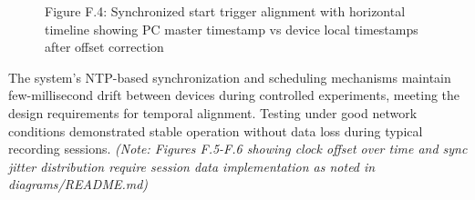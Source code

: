 \documentclass[12pt,a4paper]{article}
\begin{document}
\begin{figure}
\centering
{}
\caption{Figure F.4: Synchronized start trigger alignment with horizontal timeline showing PC master timestamp vs device local timestamps after offset correction}
\end{figure}

The system's NTP-based synchronization and scheduling mechanisms maintain few-millisecond drift between devices during controlled experiments, meeting the design requirements for temporal alignment. Testing under good network conditions demonstrated stable operation without data loss during typical recording sessions. \emph{(Note: Figures F.5-F.6 showing clock offset over time and sync jitter distribution require session data implementation as noted in diagrams/README.md)}
\end{document}
